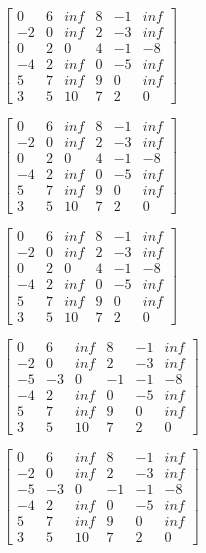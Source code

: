 \documentclass{article}
\begin{document}
$ \begin{bmatrix}
0 & 6 & inf & 8   & -1 & inf      \\
-2    & 0   & inf & 2  & -3 & inf \\
0     & 2   & 0   & 4  & -1 & -8  \\
-4    & 2   & inf & 0  & -5 & inf \\
5     & 7   & inf & 9  & 0  & inf \\
3     & 5   & 10  & 7  & 2  & 0
\end{bmatrix}  $


$ \begin{bmatrix}
0 & 6 & inf & 8   & -1 & inf      \\
-2    & 0   & inf & 2  & -3 & inf \\
0     & 2   & 0   & 4  & -1 & -8  \\
-4    & 2   & inf & 0  & -5 & inf \\
5     & 7   & inf & 9  & 0  & inf \\
3     & 5   & 10  & 7  & 2  & 0
\end{bmatrix}  $


$ \begin{bmatrix}
0 & 6 & inf & 8 & -1 & inf \\
-2 & 0 & inf & 2 & -3 & inf \\
0 & 2 & 0 & 4 & -1 & -8 \\
-4 & 2 & inf & 0 & -5 & inf \\
5 & 7 & inf & 9 & 0 & inf \\
3 & 5 & 10 & 7 & 2 & 0
\end{bmatrix}  $


$ \begin{bmatrix}
0 & 6 & inf & 8 & -1 & inf \\
-2 & 0 & inf & 2 & -3 & inf \\
-5 & -3 & 0 & -1 & -1 & -8 \\
-4 & 2 & inf & 0 & -5 & inf \\
5 & 7 & inf & 9 & 0 & inf \\
3 & 5 & 10 & 7 & 2 & 0
\end{bmatrix}  $


$ \begin{bmatrix}
0 & 6 & inf & 8 & -1 & inf \\
-2 & 0 & inf & 2 & -3 & inf \\
-5 & -3 & 0 & -1 & -1 & -8 \\
-4 & 2 & inf & 0 & -5 & inf \\
5 & 7 & inf & 9 & 0 & inf \\
3 & 5 & 10 & 7 & 2 & 0
\end{bmatrix}  $
\end{document}
